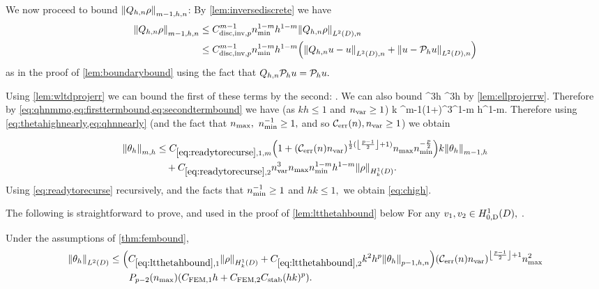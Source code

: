 We now proceed to bound $\Nfn{m-1,h,n}{\Qhn \rho}$: By \cref{lem:inversediscrete} we have
\begin{align}
  \Nfn{m-1,h,n}{\Qhn \rho} &\leq\Chinv^{m-1} \nmin^{1-m}h^{1-m} \NLtDn{\Qhn\rho}\nonumber\\
  &\leq \Chinv^{m-1} \nmin^{1-m}h^{1-m} \mleft(\NLtDn{\Qhn u - u} + \NLtDn{u-\Ph u}\mright)\label{eq:qhnmmo}
\end{align}
as in the proof of \cref{lem:boundarybound} using the fact that $Q_{h,n} \mathcal P_{h} u = \mathcal P_{h} u.$

Using \cref{lem:wltdprojerr} we can bound the first of these terms by the second:
\beq\label{eq:firsttermbound}
 \leq {} \nvar {}.
\eeq
We can also bound
\beq\label{eq:secondtermbound}
 \leq {} \nvar^3h  \leq {} \nvar^3\nmax h \NHokD{\rho}
\eeq
by \cref{lem:ellprojerrw}. Therefore by \cref{eq:qhnmmo,eq:firsttermbound,eq:secondtermbound} we have (as $kh \leq 1$ and $n_{\mathrm{var}} \geq 1$)
\beq\label{eq:qhnnearly}
k  \leq \Chinv^{m-1}\Cwz \mleft(1+\mright)\nvar^3\nmax\nmin^{1-m} h^{1-m}\NHokD{\rho}.
\eeq
Therefore using \cref{eq:thetahighnearly,eq:qhnnearly} (and the fact that $n_{\max},$ ${}n_{\min}^{-1} \geq 1,$ and so $\En, \nvar \geq1$)  we obtain

\begin{align}
  \Nfn{m,h}{\thetah} &\leq \CRecofn{m} \mleft(1+\mleft(\En\nvar\mright)^{\half(\floor{\frac{p-1}2}+1)}\nmax\nmin^{-\frac{p}2}\mright)k \Nfn{m-1,h}{\thetah}\nonumber\\
  &\quad+ \CRect \nvar^3\nmax\nmin^{1-m} h^{1-m} \NHokD{\rho}.\label{eq:readytorecurse}
\end{align}
Using \cref{eq:readytorecurse} recursively, and the facts that $n_{\min}^{-1} \geq 1$ and $hk \leq 1,$ we obtain \cref{eq:chigh}.
\epf

The following  is straightforward to prove, and used in the proof of \cref{lem:ltthetahbound} below
\ble[Continuity of $\aT$]\label{lem:continuity}
For any $\vo, \vt \in \HozDD,$
\beqs
\abs{\aT(\vo,\vt)} \leq \Cc \nmax \NHokD{\vo}\NHokD{\vt}.
\eeqs
\ele

\label{lem:ltthetahbound}
Under the assumptions of \cref{thm:fembound},%
\begin{align}
\NLtD{\thetah}&\leq \mleft(\Cfirst\NHokD{\rho} +\Csecond  k^2h^p\Nfn{p-1,h,n}{\thetah}\mright)\mleft(\En \nvar\mright)^{\floor{\frac{p-1}2}+1}\nmax^2\nonumber\\
&\quad\quad\Pfn{p-2}\mleft(\nmax\mright)\mleft(\CFEMotilde h + \CFEMttilde \CAnk (hk)^p\mright).\label{eq:ltthetahbound}
\end{align}
\ele

